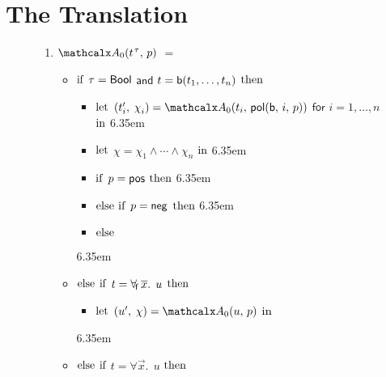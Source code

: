 
\section{The Translation}
\label{sec:encoding}

\newcommand{\itemx}{\itemindent6.35em\item}

\begin{figure}[t]
\normalsize
\begin{enumerate}
\itemx[\ ]
$\conv_0( t\typ{\tau},\, p )$ $=$
 \begin{itemize}
   \itemx[] $\textrm{if}$ $\tau = \mathsf{Bool}$ $\mathsf{and}$ $t = \mathsf{b}(t_1,\ldots,t_n)$ $\textrm{then}$
    \begin{itemize}
      \itemx[] $\textrm{let}$ $( t'_i,\, \chi_i ) = \conv_0( t_i,\, \pol( \boolop,\, i,\, p ) )$ $\mathsf{for}$ $i = 1, \ldots, n$ $\textrm{in}$%
      \itemx[] $\textrm{let}$ $\chi = \chi_1 \wedge \cdots \wedge \chi_n$ $\textrm{in}$
      \itemx[] $\textrm{if}$ $p = \mathsf{pos}$ $\textrm{then}$ 
      \itemx[] $\textrm{else}$ $\textrm{if}$ $p = \mathsf{neg}$ $\textrm{then}$ 
      \itemx[] $\textrm{else}$ 
    \end{itemize}
  \itemx[] $\textrm{else}$ $\textrm{if}$ $t = \forall_{\!\mathsf{f}\:} \overline{x}.\;\, u$ $\textrm{then}$
    \begin{itemize}
      \itemx[] $\textrm{let}$ $( u',\, \chi ) = \conv_0( u,\, p )$ $\textrm{in}$ 
    \end{itemize}
  \itemx[] $\textrm{else}$ $\textrm{if}$ $t = \forall \vec x.\;\, u$ $\textrm{then}$
    \begin{itemize}

\end{itemize}
\end{itemize}
\end{enumerate}
\end{figure}
